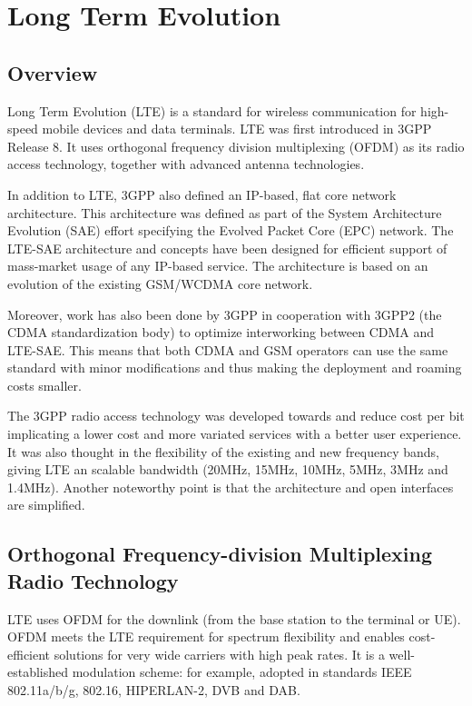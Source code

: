 
\section{Long Term Evolution} %
\label{let:lte}

\subsection{Overview}

Long Term Evolution (LTE) is a standard for wireless communication for
high-speed mobile devices and data terminals. LTE was first introduced in 3GPP
Release 8. It uses orthogonal frequency division multiplexing (OFDM) as its
radio access technology, together with advanced antenna technologies.

In addition to LTE, 3GPP also defined an IP-based, flat core network
architecture. This architecture was defined as part of the System Architecture
Evolution (SAE) effort specifying the Evolved Packet Core (EPC) network. The
LTE-SAE architecture and concepts have been designed for efficient support of
mass-market usage of any IP-based service. The architecture is based on an
evolution of the existing GSM/WCDMA core network.%

Moreover, work has also been done by 3GPP in cooperation with 3GPP2 (the CDMA
standardization body) to optimize interworking between CDMA and LTE-SAE. This means
that both CDMA and GSM operators can use the same standard with minor modifications
and thus making the deployment and roaming costs smaller.

The 3GPP radio access technology was developed towards and reduce cost per bit
implicating a lower cost and more variated services with a better user
experience. It was also thought in the flexibility of the existing and new
frequency  bands, giving LTE an scalable bandwidth (20MHz, 15MHz, 10MHz, 5MHz,
3MHz and 1.4MHz). Another noteworthy point is that the architecture and open
interfaces are simplified.

\subsection{Orthogonal Frequency-division Multiplexing Radio Technology} %

LTE uses OFDM for the downlink (from the base station to the terminal or UE).
OFDM meets the LTE requirement for spectrum flexibility and enables
cost-efficient solutions for very wide carriers with high peak rates. It is a
well-established modulation scheme: for example, adopted in standards IEEE
802.11a/b/g, 802.16, HIPERLAN-2, DVB and DAB.

